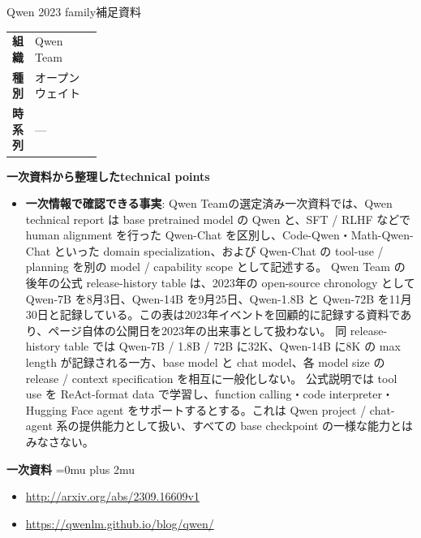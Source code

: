 \begin{technicalnote}{Qwen 2023 family}{補足資料}
\begingroup
\begin{tabularx}{\linewidth}{@{}>{\bfseries}p{0.22\linewidth}X@{}}
組織 & Qwen Team \\
種別 & オープンウェイト \\
時系列 & — \\
\end{tabularx}
\smallskip
{\bfseries 一次資料から整理したtechnical points}
\begin{itemize}[leftmargin=1.5em,itemsep=0.35em]
\item \textbf{一次情報で確認できる事実}: Qwen Teamの選定済み一次資料では、Qwen technical report は base pretrained model の Qwen と、SFT / RLHF などで human alignment を行った Qwen-Chat を区別し、Code-Qwen・Math-Qwen-Chat といった domain specialization、および Qwen-Chat の tool-use / planning を別の model / capability scope として記述する。 Qwen Team の後年の公式 release-history table は、2023年の open-source chronology として Qwen-7B を8月3日、Qwen-14B を9月25日、Qwen-1.8B と Qwen-72B を11月30日と記録している。この表は2023年イベントを回顧的に記録する資料であり、ページ自体の公開日を2023年の出来事として扱わない。 同 release-history table では Qwen-7B / 1.8B / 72B に32K、Qwen-14B に8K の max length が記録される一方、base model と chat model、各 model size の release / context specification を相互に一般化しない。 公式説明では tool use を ReAct-format data で学習し、function calling・code interpreter・Hugging Face agent をサポートするとする。これは Qwen project / chat-agent 系の提供能力として扱い、すべての base checkpoint の一様な能力とはみなさない。
\end{itemize}
\begin{minipage}{\linewidth}
\begin{samepage}
{\bfseries 一次資料}
\begingroup\sloppy
\Urlmuskip=0mu plus 2mu\relax
\begin{itemize}[leftmargin=1.5em,itemsep=0.25em]
\item {\scriptsize\url{http://arxiv.org/abs/2309.16609v1}}
\item {\scriptsize\url{https://qwenlm.github.io/blog/qwen/}}
\end{itemize}
\endgroup
\end{samepage}
\end{minipage}
\endgroup
\end{technicalnote}
\medskip
